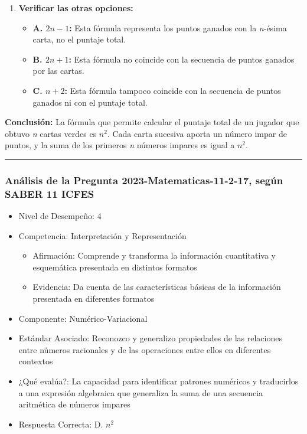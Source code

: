 \documentclass[
]{article}
\providecommand{\tightlist}{%
  \setlength{\itemsep}{0pt}\setlength{\parskip}{0pt}}
\begin{document}
\begin{enumerate}
  \(S_n = \frac{n}{2} [2a_1 + (n-1)d]\)

  Sustituyendo los valores:

  \(S_n = \frac{n}{2} [2(1) + (n-1)2]\)
  \(S_n = \frac{n}{2} [2 + 2n - 2]\) \(S_n = \frac{n}{2} [2n]\)
  \(S_n = n^2\)
\item
  \textbf{Verificar las otras opciones:}

  \begin{itemize}
  \tightlist
  \item
    \textbf{A. \(2n - 1\):} Esta fórmula representa los puntos ganados
    con la \emph{n}-ésima carta, no el puntaje total.
  \item
    \textbf{B. \(2n + 1\):} Esta fórmula no coincide con la secuencia de
    puntos ganados por las cartas.
  \item
    \textbf{C. \(n + 2\):} Esta fórmula tampoco coincide con la
    secuencia de puntos ganados ni con el puntaje total.
  \end{itemize}
\end{enumerate}

\textbf{Conclusión:} La fórmula que permite calcular el puntaje total de
un jugador que obtuvo \emph{n} cartas verdes es \textbf{\(n^2\)}. Cada
carta sucesiva aporta un número impar de puntos, y la suma de los
primeros \emph{n} números impares es igual a \(n^2\).

\begin{center}\rule{0.5\linewidth}{0.5pt}\end{center}

\subsubsection{Análisis de la Pregunta 2023-Matematicas-11-2-17, según
SABER 11
ICFES}\label{anuxe1lisis-de-la-pregunta-2023-matematicas-11-2-17-seguxfan-saber-11-icfes}

\begin{itemize}
\item
  Nivel de Desempeño: 4
\item
  Competencia: Interpretación y Representación

  \begin{itemize}
  \tightlist
  \item
    Afirmación: Comprende y transforma la información cuantitativa y
    esquemática presentada en distintos formatos
  \item
    Evidencia: Da cuenta de las características básicas de la
    información presentada en diferentes formatos
  \end{itemize}
\item
  Componente: Numérico-Variacional
\item
  Estándar Asociado: Reconozco y generalizo propiedades de las
  relaciones entre números racionales y de las operaciones entre ellos
  en diferentes contextos
\item
  ¿Qué evalúa?: La capacidad para identificar patrones numéricos y
  traducirlos a una expresión algebraica que generaliza la suma de una
  secuencia aritmética de números impares
\item
  Respuesta Correcta: D. \(n^2\)
\end{itemize}
\end{document}
